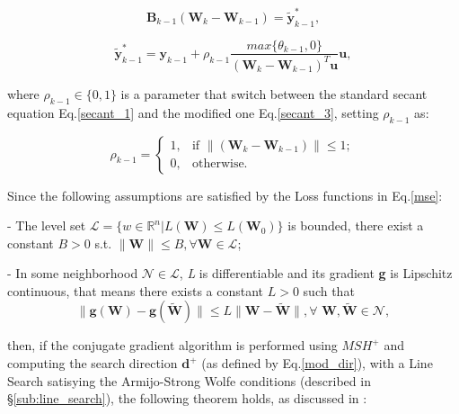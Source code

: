  			\begin{equation}
			\label{secant_3}
 				\textbf{B}_{k-1} (\textbf{W}_k - \textbf{W}_{k-1}) = \widetilde{\textbf{y}}_{k-1}^*,
 			\end{equation}

 			\begin{equation}
			\label{y_3}
 				\widetilde{\textbf{y}}_{k-1}^* = \textbf{y}_{k-1} + \rho_{k-1} \frac{max\{\theta_{k-1},0\}}{(\textbf{W}_k - \textbf{W}_{k-1})^T\textbf{u}}\textbf{u},
 			\end{equation}

 			where $\rho_{k-1} \in \{0,1\}$ is a parameter that switch between the standard secant equation Eq.\ref{secant_1} and the modified one Eq.\ref{secant_3}, setting $\rho_{k-1}$ as:

			\begin{equation}
			\label{rho}
			  \rho_{k-1} =\begin{cases}
			    1 , & \text{if }\|(\textbf{W}_k - \textbf{W}_{k-1})\| \leq 1;\\
			    0 , & \text{otherwise.}
			  \end{cases}
			\end{equation}

			Since the following assumptions are satisfied by the Loss functions in Eq.\ref{mse}:

			\begin{asu} - \label{as:1}
  				The level set $\mathcal{L} = \{w \in \mathbb{R}^n | \textit{L}(\textbf{W}) \leq L(\textbf{W}_0)\}$ is bounded, there exist a constant $B > 0$ s.t. $\|\textbf{W}\| \leq B, \forall \textbf{W} \in \mathcal{L}$;
			\end{asu}

			\begin{asu} - \label{as:2}
				In some neighborhood $\mathcal{N} \in \mathcal{L}$, \textit{L} is differentiable and its gradient \textbf{g} is Lipschitz continuous, that means there exists a constant $ L > 0 $ such that
				\begin{equation}
				\label{ass2}
				  \|\textbf{g}(\textbf{W})-\textbf{g}(\widetilde{\textbf{W}})\| \leq L\|\textbf{W}-\widetilde{\textbf{W}}\|, \forall \textbf{ W},\widetilde{\textbf{W}} \in \mathcal{N},
				\end{equation}
			\end{asu}
			then, if the conjugate gradient algorithm is performed using $MSH^+$ and computing the search direction $\textbf{d}^+$ (as defined by Eq.\ref{mod_dir}), with a Line Search satisying the Armijo-Strong Wolfe conditions (described in \S \ref{sub:line_search}), the following theorem holds, as discussed in \cite{LIVIERIS2013491}:

